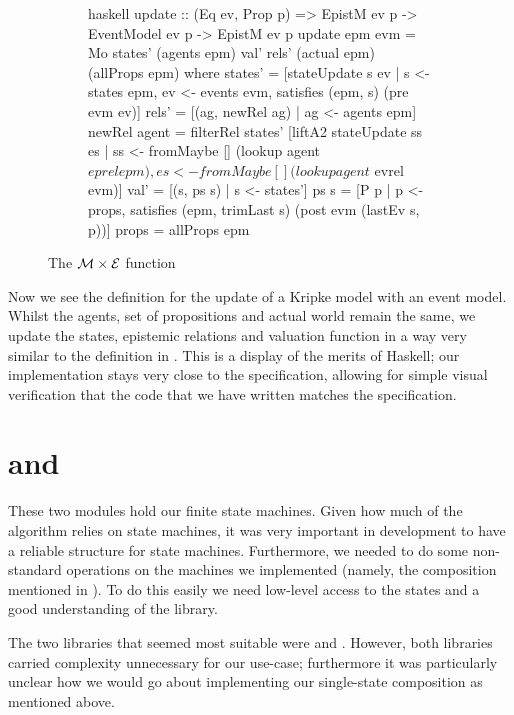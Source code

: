 \documentclass[ %
                    author={Leo Poulson},
                supervisor={Dr. Steven Ramsay},
                    degree={BSc},
                     title={Epistemic Planning for the Dynamic Gossip problem},
                  subtitle={},
                      year={2019} ]{dissertation}
\begin{document}
\begin{figure}[h]
  \begin{subfigure}[b]{0.5\textwidth}
  \begin{cminted}{haskell}
    update :: (Eq ev, Prop p) => EpistM ev p -> EventModel ev p -> EpistM ev p
    update epm evm = Mo states' (agents epm) val' rels' (actual epm) (allProps epm)
      where
        states' = [stateUpdate s ev | s <- states epm,
                                      ev <- events evm,
                                      satisfies (epm, s) (pre evm ev)]
        rels' = [(ag, newRel ag) | ag <- agents epm]
        newRel agent = filterRel states' [liftA2 stateUpdate ss es |
                                          ss <- fromMaybe [] (lookup agent $ eprel epm),
                                          es <- fromMaybe [] (lookup agent $ evrel evm)]
        val' = [(s, ps s) | s <- states']
        ps s = [P p | p <- props, satisfies (epm, trimLast s) (post evm (lastEv s, p))]
        props = allProps epm
  \end{cminted}
\end{subfigure}
\caption{The $\mathcal{M} \times \mathcal{E}$ function}
\label{fig:update}
\end{figure}

Now we see the definition for the update of a Kripke model with an event model.
Whilst the agents, set of propositions and actual world remain the same, we
update the states, epistemic relations and valuation function in a way very
similar to the definition in . This is a display of
the merits of Haskell; our implementation stays very close to the specification,
allowing for simple visual verification that the code that we have written matches
the specification. 

\section{ and }

These two modules hold our finite state machines. Given how much of the
algorithm relies on state machines, it was very important in development to have
a reliable structure for state machines. Furthermore, we needed to do some
non-standard operations on the machines we implemented (namely, the composition
mentioned in ). To do this easily we need
low-level access to the states and a good understanding of the library. 

The two libraries that seemed most suitable were \cite{HaskellFST} and
\cite{HaskellMachines}. However, both libraries carried complexity unnecessary
for our use-case; furthermore it was particularly unclear how we would go
about implementing our single-state composition as mentioned above. 
\end{document}
